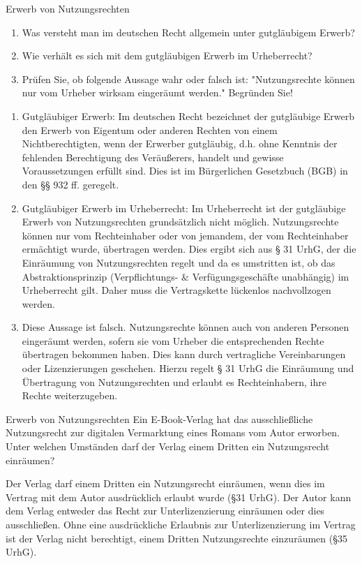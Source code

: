 \documentclass{article}
\begin{document}
\begin{exercise}{Erwerb von Nutzungsrechten}
  \begin{enumerate}
    \item Was versteht man im deutschen Recht allgemein unter gutgläubigem Erwerb?
    \item Wie verhält es sich mit dem gutgläubigen Erwerb im Urheberrecht?
    \item Prüfen Sie, ob folgende Aussage wahr oder falsch ist: "Nutzungsrechte können nur vom Urheber wirksam eingeräumt werden." Begründen Sie!
  \end{enumerate}

  \begin{solution}
    \begin{enumerate}
      \item Gutgläubiger Erwerb: Im deutschen Recht bezeichnet der gutgläubige Erwerb den Erwerb von Eigentum oder anderen Rechten von einem Nichtberechtigten, wenn der Erwerber gutgläubig, d.h. ohne Kenntnis der fehlenden Berechtigung des Veräußerers, handelt und gewisse Voraussetzungen erfüllt sind. Dies ist im Bürgerlichen Gesetzbuch (BGB) in den §§ 932 ff. geregelt.
      \item Gutgläubiger Erwerb im Urheberrecht: Im Urheberrecht ist der gutgläubige Erwerb von Nutzungsrechten grundsätzlich nicht möglich. Nutzungsrechte können nur vom Rechteinhaber oder von jemandem, der vom Rechteinhaber ermächtigt wurde, übertragen werden. Dies ergibt sich aus § 31 UrhG, der die Einräumung von Nutzungsrechten regelt und da es umstritten ist, ob das Abstraktionsprinzip (Verpflichtungs- \& Verfügungsgeschäfte unabhängig) im Urheberrecht gilt. Daher muss die Vertragskette lückenlos nachvollzogen werden.
      \item Diese Aussage ist falsch. Nutzungsrechte können auch von anderen Personen eingeräumt werden, sofern sie vom Urheber die entsprechenden Rechte übertragen bekommen haben. Dies kann durch vertragliche Vereinbarungen oder Lizenzierungen geschehen. Hierzu regelt § 31 UrhG die Einräumung und Übertragung von Nutzungsrechten und erlaubt es Rechteinhabern, ihre Rechte weiterzugeben.
    \end{enumerate}
  \end{solution}
\end{exercise}


\begin{exercise}{Erwerb von Nutzungsrechten}
  Ein E-Book-Verlag hat das ausschließliche Nutzungsrecht zur digitalen Vermarktung eines Romans vom Autor erworben. Unter welchen Umständen darf der Verlag einem Dritten ein Nutzungsrecht einräumen?

  \begin{solution}
    Der Verlag darf einem Dritten ein Nutzungsrecht einräumen, wenn dies im Vertrag mit dem Autor ausdrücklich erlaubt wurde (§31 UrhG). Der Autor kann dem Verlag entweder das Recht zur Unterlizenzierung einräumen oder dies ausschließen. Ohne eine ausdrückliche Erlaubnis zur Unterlizenzierung im Vertrag ist der Verlag nicht berechtigt, einem Dritten Nutzungsrechte einzuräumen (§35 UrhG).
  \end{solution}
\end{exercise}
\end{document}
